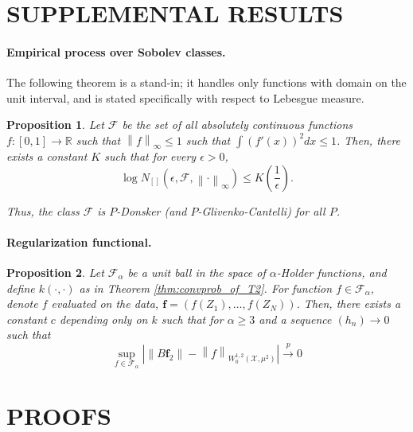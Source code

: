 \documentclass{article}
\newcommand{\Reals}{\mathbb{R}}
\newcommand{\convprob}{\overset{p}{\to}}
\newcommand{\norm}[1]{\left\lVert#1\right\rVert}
\newcommand{\abs}[1]{\left \lvert #1 \right \rvert}
\newcommand{\F}{\mathcal{F}}
\newcommand{\X}{\mathcal{X}}
\theoremstyle{alden}
\newtheorem{proposition}{Proposition}
\theoremstyle{definition}
\theoremstyle{remark}
\begin{document}
\section{SUPPLEMENTAL RESULTS}

\paragraph{Empirical process over Sobolev classes.}

The following theorem is a stand-in; it handles only functions with domain on the unit interval, and is stated specifically with respect to Lebesgue measure.
\begin{proposition}
	\label{prop: sobolev_donsker}
	Let $\F$ be the set of all absolutely continuous functions $f: [0,1] \to \Reals$ such that $\norm{f}_{\infty} \leq 1$ such that $\int (f'(x))^2 dx \leq 1$. Then, there exists a constant $K$ such that for every $\epsilon > 0$,
	\begin{equation*}
	\log N_{[]}(\epsilon, \mathcal{F}, \norm{\cdot}_{\infty}) \leq K\left(\frac{1}{\epsilon}\right).
	\end{equation*} 
	
	Thus, the class $\mathcal{F}$ is $P$-Donsker (and $P$-Glivenko-Cantelli) for all $P$.
\end{proposition}

\paragraph{Regularization functional.}

\begin{proposition}
	\label{prop: convprob_regularization_functional}
	Let $\mathcal{F}_{\alpha}$ be a unit ball in the space of $\alpha$-Holder functions, and define $k(\cdot,\cdot)$ as in Theorem \ref{thm:convprob_of_T2}. For function $f \in \F_{\alpha}$, denote $f$ evaluated on the data, $\mathbf{f} = (f(Z_1), \ldots, f(Z_N))$. Then, there exists a constant $c$ depending only on $k$ such that for $\alpha \geq 3$ and a sequence $(h_n) \to 0$ such that
	\begin{equation*}
	\sup_{f \in \mathcal{F}_{\alpha}} \abs{ \norm{B \mathbf{f}_2} - \norm{f}_{W_0^{1,2}(\X, \mu^2)} } \convprob 0
	\end{equation*}
\end{proposition}





\section{PROOFS}
\end{document}
